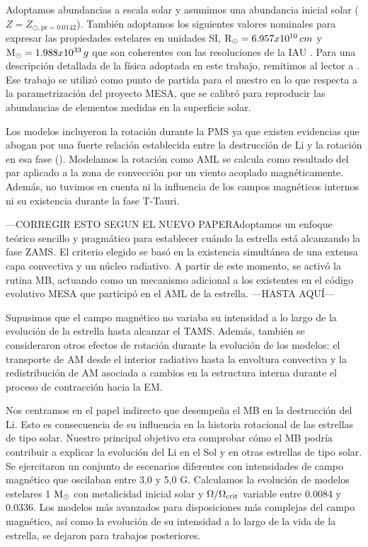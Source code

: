 Adoptamos abundancias a escala solar y asumimos una abundancia inicial solar ($Z = Z_{\odot, \mathrm{pr} = 0.0142}$). También adoptamos los siguientes valores nominales para expresar las propiedades estelares en unidades SI, $\mathrm{R}_\odot = 6.957x10^{10}\, cm$ y $\mathrm{M}_\odot = 1.988x10^{33}\, g$ que son coherentes con las resoluciones de la IAU \cite{Mamajek2015}. Para una descripción detallada de la física adoptada en este trabajo, remitimos al lector a \cite{Choi2016}. Ese trabajo se utilizó como punto de partida para el nuestro en lo que respecta a la parametrización del proyecto MESA, que se calibró para reproducir las abundancias de elementos medidas en la superficie solar.\par

Los modelos incluyeron la rotación durante la PMS ya que existen evidencias que abogan por una fuerte relación establecida entre la destrucción de Li y la rotación en esa fase (\cite{Bouvier2016,Bouvier2018}). Modelamos la rotación como AML se calcula como resultado del par aplicado a la zona de convección por un viento acoplado magnéticamente. Además, no tuvimos en cuenta ni la influencia de los campos magnéticos internos ni su existencia durante la fase T-Tauri.\par 
---CORREGIR ESTO SEGUN EL NUEVO PAPERAdoptamos un enfoque teórico sencillo y pragmático para establecer cuándo la estrella está alcanzando la fase ZAMS. El criterio elegido se basó en la existencia simultánea de una extensa capa convectiva y un núcleo radiativo. A partir de este momento, se activó la rutina MB, actuando como un mecanismo adicional a los existentes en el código evolutivo MESA que participó en el AML de la estrella. ---HASTA AQUÍ---\par

Supusimos que el campo magnético no variaba su intensidad a lo largo de la evolución de la estrella hasta alcanzar el TAMS. Además, también se consideraron otros efectos de rotación durante la evolución de los modelos: el transporte de AM desde el interior radiativo hasta la envoltura convectiva y la redistribución de AM asociada a cambios en la estructura interna durante el proceso de contracción hacia la EM.\par

Nos centramos en el papel indirecto que desempeña el MB en la destrucción del Li. Esto es consecuencia de su influencia en la historia rotacional de las estrellas de tipo solar. Nuestro principal objetivo era comprobar cómo el MB podría contribuir a explicar la evolución del Li en el Sol y en otras estrellas de tipo solar. Se ejercitaron un conjunto de escenarios diferentes con intensidades de campo magnético que oscilaban entre 3,0 y 5,0 G. Calculamos la evolución de modelos estelares 1 $\mathrm{M}_\odot$ con metalicidad inicial solar y $\Omega / \Omega_{\mathrm{crit}}$ variable entre $0.0084$ y $0.0336$. Los modelos más avanzados para disposiciones más complejas del campo magnético, así como la evolución de su intensidad a lo largo de la vida de la estrella, se dejaron para trabajos posteriores.\par

